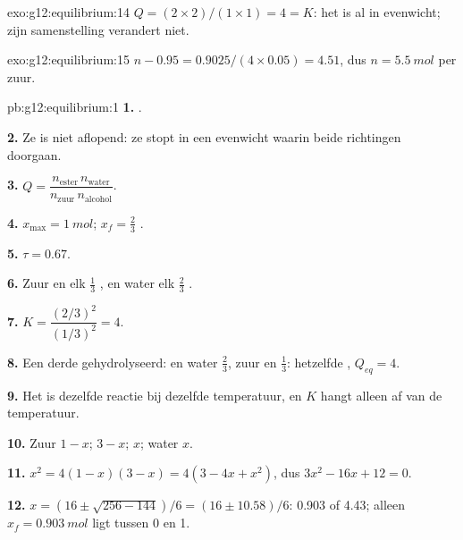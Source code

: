 \begin{solution}{exo:g12:equilibrium:14}
$Q = (2 \times 2)/(1 \times 1) = 4 = K$: het  is al in evenwicht;
zijn samenstelling verandert niet.
\end{solution}

\begin{solution}{exo:g12:equilibrium:15}
$n - 0.95 = 0.9025 / (4 \times 0.05) = 4.51$, dus $n = \qty{5.5}{mol}$
 per  zuur.
\end{solution}

\begin{solution}{pb:g12:equilibrium:1}
\textbf{1.} .

\textbf{2.} Ze is niet aflopend: ze stopt in een evenwicht waarin beide
richtingen doorgaan.

\textbf{3.} $Q = \dfrac{n_{\text{ester}}\, n_{\text{water}}}{n_{\text{zuur}}\, n_{\text{alcohol}}}$.

\textbf{4.} $x_{\max} = \qty{1}{mol}$; $x_f = \frac{2}{3}$ .

\textbf{5.} $\tau = 0.67$.

\textbf{6.} Zuur en  elk $\frac{1}{3}$ ,  en water elk
$\frac{2}{3}$ .

\textbf{7.} $K = \dfrac{(2/3)^2}{(1/3)^2} = 4$.

\textbf{8.} Een derde gehydrolyseerd:  en water $\frac{2}{3}$, zuur
en  $\frac{1}{3}$: hetzelfde , $Q_{eq} = 4$.

\textbf{9.} Het is dezelfde reactie bij dezelfde temperatuur, en $K$ hangt
alleen af van de temperatuur.

\textbf{10.} Zuur $1 - x$;  $3 - x$;  $x$; water $x$.

\textbf{11.} $x^2 = 4(1 - x)(3 - x) = 4(3 - 4x + x^2)$, dus
$3x^2 - 16x + 12 = 0$.

\textbf{12.} $x = (16 \pm \sqrt{256 - 144})/6 = (16 \pm 10.58)/6$: 0.903
of 4.43; alleen $x_f = \qty{0.903}{mol}$ ligt tussen 0 en 1.


\end{solution}
